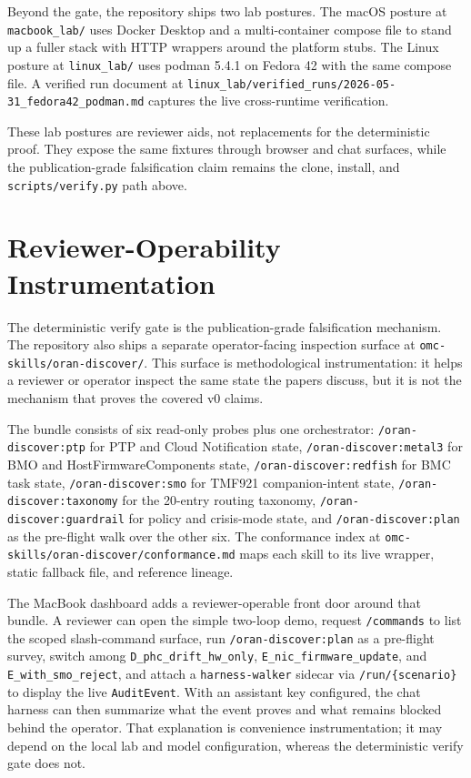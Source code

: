 \documentclass[twocolumn,10pt,a4paper]{article}
\begin{document}
Beyond the gate, the repository ships two lab postures. The macOS posture at \texttt{macbook\_lab/} uses Docker Desktop and a multi-container compose file to stand up a fuller stack with HTTP wrappers around the platform stubs. The Linux posture at \texttt{linux\_lab/} uses podman 5.4.1 on Fedora 42 with the same compose file. A verified run document at \texttt{linux\_lab/verified\_runs/2026-05-31\_fedora42\_podman.md} captures the live cross-runtime verification.

These lab postures are reviewer aids, not replacements for the deterministic proof. They expose the same fixtures through browser and chat surfaces, while the publication-grade falsification claim remains the clone, install, and \texttt{scripts/verify.py} path above.

\section{Reviewer-Operability Instrumentation}
\label{sec:discover}

The deterministic verify gate is the publication-grade falsification mechanism. The repository also ships a separate operator-facing inspection surface at \texttt{omc-skills/oran-discover/}. This surface is methodological instrumentation: it helps a reviewer or operator inspect the same state the papers discuss, but it is not the mechanism that proves the covered v0 claims.

The bundle consists of six read-only probes plus one orchestrator: \texttt{/oran-discover:ptp} for PTP and Cloud Notification state, \texttt{/oran-discover:metal3} for BMO and HostFirmwareComponents state, \texttt{/oran-discover:redfish} for BMC task state, \texttt{/oran-discover:smo} for TMF921 companion-intent state, \texttt{/oran-discover:taxonomy} for the 20-entry routing taxonomy, \texttt{/oran-discover:guardrail} for policy and crisis-mode state, and \texttt{/oran-discover:plan} as the pre-flight walk over the other six. The conformance index at \texttt{omc-skills/oran-discover/conformance.md} maps each skill to its live wrapper, static fallback file, and reference lineage.

The MacBook dashboard adds a reviewer-operable front door around that bundle. A reviewer can open the simple two-loop demo, request \texttt{/commands} to list the scoped slash-command surface, run \texttt{/oran-discover:plan} as a pre-flight survey, switch among \texttt{D\_phc\_drift\_hw\_only}, \texttt{E\_nic\_firmware\_update}, and \texttt{E\_with\_smo\_reject}, and attach a \texttt{harness-walker} sidecar via \texttt{/run/\{scenario\}} to display the live \texttt{AuditEvent}. With an assistant key configured, the chat harness can then summarize what the event proves and what remains blocked behind the operator. That explanation is convenience instrumentation; it may depend on the local lab and model configuration, whereas the deterministic verify gate does not.
\end{document}

